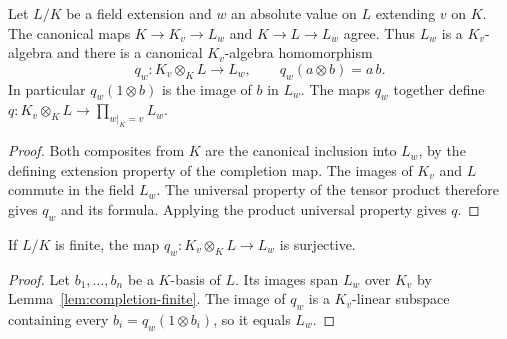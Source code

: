 \begin{definition}
\label{def:completion-tensor-map}
\leanok
{}
Let $L/K$ be a field extension and $w$ an absolute value on $L$
extending $v$ on $K$. The canonical maps $K\to K_v\to L_w$ and
$K\to L\to L_w$ agree. Thus $L_w$ is a $K_v$-algebra and there is a
canonical $K_v$-algebra homomorphism
\[
 q_w:K_v\otimes_KL\longrightarrow L_w,\qquad
 q_w(a\otimes b)=a\,b.
\]
In particular $q_w(1\otimes b)$ is the image of $b$ in $L_w$.
The maps $q_w$ together define
$q:K_v\otimes_KL\to\prod_{w|_K=v}L_w$.
\end{definition}
\begin{proof}
Both composites from $K$ are the canonical inclusion into $L_w$,
by the defining extension property of the completion map.
The images of $K_v$ and $L$ commute in the field $L_w$. The universal
property of the tensor product therefore gives $q_w$ and its formula.
Applying the product universal property gives $q$.
\end{proof}

\begin{lemma}
\label{lem:completion-tensor-surjective}
\leanok
{}
If $L/K$ is finite, the map $q_w:K_v\otimes_KL\to L_w$ is surjective.
\end{lemma}
\begin{proof}
Let $b_1,\ldots,b_n$ be a $K$-basis of $L$. Its images span $L_w$
over $K_v$ by Lemma~\ref{lem:completion-finite}. The image of $q_w$
is a $K_v$-linear subspace containing every $b_i=q_w(1\otimes b_i)$,
so it equals $L_w$.
\end{proof}

